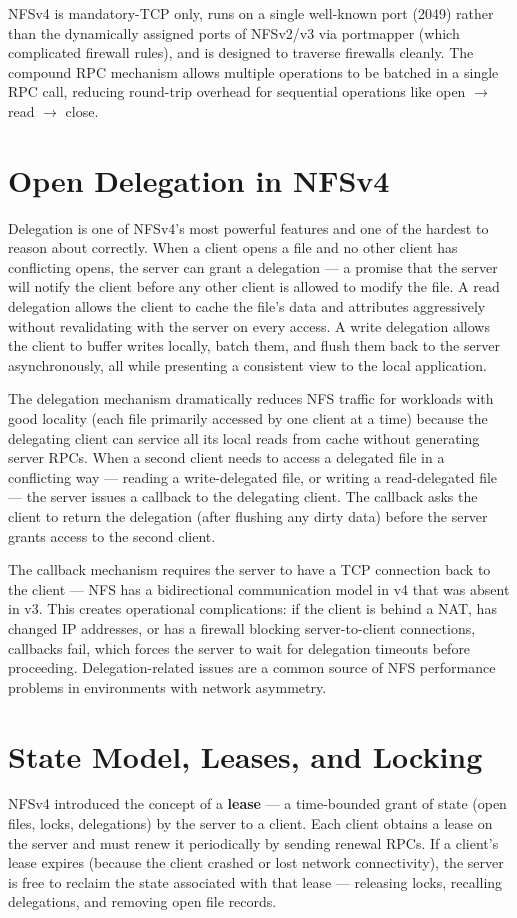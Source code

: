 NFSv4 is mandatory-TCP only, runs on a single well-known port (2049) rather than the dynamically assigned ports of NFSv2/v3 via portmapper (which complicated firewall rules), and is designed to traverse firewalls cleanly. The compound RPC mechanism allows multiple operations to be batched in a single RPC call, reducing round-trip overhead for sequential operations like open $\rightarrow$ read $\rightarrow$ close.

\section{Open Delegation in NFSv4}
Delegation is one of NFSv4's most powerful features and one of the hardest to reason about correctly. When a client opens a file and no other client has conflicting opens, the server can grant a delegation --- a promise that the server will notify the client before any other client is allowed to modify the file. A read delegation allows the client to cache the file's data and attributes aggressively without revalidating with the server on every access. A write delegation allows the client to buffer writes locally, batch them, and flush them back to the server asynchronously, all while presenting a consistent view to the local application.

The delegation mechanism dramatically reduces NFS traffic for workloads with good locality (each file primarily accessed by one client at a time) because the delegating client can service all its local reads from cache without generating server RPCs. When a second client needs to access a delegated file in a conflicting way --- reading a write-delegated file, or writing a read-delegated file --- the server issues a callback to the delegating client. The callback asks the client to return the delegation (after flushing any dirty data) before the server grants access to the second client.

The callback mechanism requires the server to have a TCP connection back to the client --- NFS has a bidirectional communication model in v4 that was absent in v3. This creates operational complications: if the client is behind a NAT, has changed IP addresses, or has a firewall blocking server-to-client connections, callbacks fail, which forces the server to wait for delegation timeouts before proceeding. Delegation-related issues are a common source of NFS performance problems in environments with network asymmetry.

\section{State Model, Leases, and Locking}
NFSv4 introduced the concept of a \textbf{lease} --- a time-bounded grant of state (open files, locks, delegations) by the server to a client. Each client obtains a lease on the server and must renew it periodically by sending renewal RPCs. If a client's lease expires (because the client crashed or lost network connectivity), the server is free to reclaim the state associated with that lease --- releasing locks, recalling delegations, and removing open file records.

